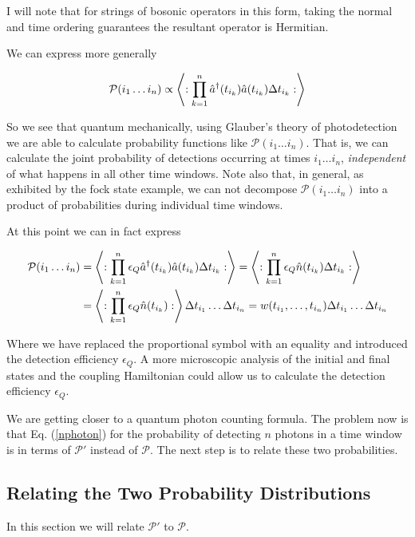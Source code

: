 \documentclass[12pt]{article}
\begin{document}
I will note that for strings of bosonic operators in this form, taking the normal and time ordering guarantees the resultant operator is Hermitian. 

We can express more generally

\begin{align}
\mathcal{P}(i_1 \ldots i_n) \propto \Braket{:\prod_{k=1}^n \hat{a}^{\dag}(t_{i_k})\hat{a}(t_{i_k})\Delta t_{i_k} :}
\end{align}

So we see that quantum mechanically, using Glauber's theory of photodetection we are able to calculate probability functions like $\mathcal{P}(i_1\ldots i_n)$. That is, we can calculate the joint probability of detections occurring at times $i_1 \ldots i_n$, \textit{independent} of what happens in all other time windows. Note also that, in general, as exhibited by the fock state example, we can not decompose $\mathcal{P}(i_1 \ldots i_n)$ into a product of probabilities during individual time windows. 

At this point we can in fact express

\begin{align}
\mathcal{P}(i_1 \ldots i_n) &= \Braket{:\prod_{k=1}^n \epsilon_Q \hat{a}^{\dag}(t_{i_k})\hat{a}(t_{i_k})\Delta t_{i_k} :} = \Braket{:\prod_{k=1}^n \epsilon_Q \hat{n}(t_{i_k})\Delta t_{i_k} :}\\
&= \Braket{:\prod_{k=1}^n \epsilon_Q \hat{n}(t_{i_k}):} \Delta t_{i_1} \ldots \Delta t_{i_n} = w(t_{i_1},\ldots ,t_{i_{n}}) \Delta t_{i_1} \ldots \Delta t_{i_n}
\end{align}

Where we have replaced the proportional symbol with an equality and introduced the detection efficiency $\epsilon_Q$. A more microscopic analysis of the initial and final states and the coupling Hamiltonian could allow us to calculate the detection efficiency $\epsilon_Q$.

We are getting closer to a quantum photon counting formula. The problem now is that Eq. (\ref{nphoton}) for the probability of detecting $n$ photons in a time window is in terms of $\mathcal{P}'$ instead of $\mathcal{P}$. The next step is to relate these two probabilities.

\subsection{Relating the Two Probability Distributions}

In this section we will relate $\mathcal{P}'$ to $\mathcal{P}$.
\end{document}

